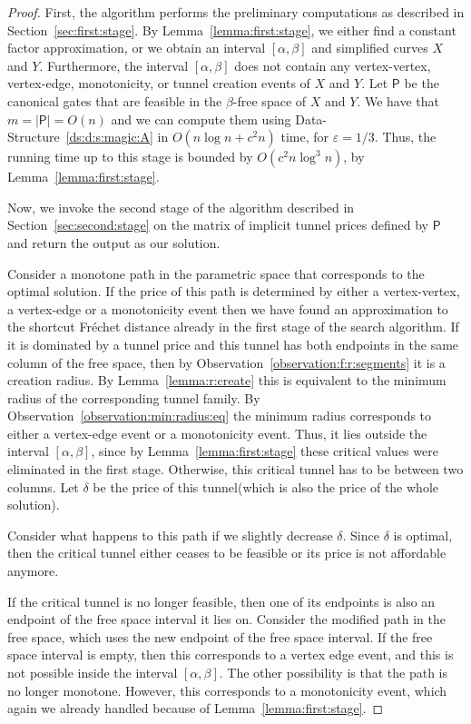 \documentclass[12pt]{article}
\newcommand{\secref}[1]{Section~\ref{sec:#1}}
\newcommand{\lemref}[1]{Lemma~\ref{lemma:#1}}
\newcommand{\dsref}[1]{Data-Structure~\ref{ds:#1}}
\newcommand{\obsref}[1]{Observation~\ref{observation:#1}}
\newcommand{\cardin}[1]{\left| {#1} \right|}
\newcommand{\Frechet}{Fr\'{e}c{h}e{}t\xspace}\providecommand{\Arr}{\mathop{\mathrm{\EuScript{A}}}}
\newcommand{\SimplifyX}[1]{#1}
\newcommand{\cXBase}{X} \newcommand{\cYBase}{Y} \newcommand{\crvCBase}{{\pi}}
\newcommand{\cX}{\SimplifyX{\cXBase}}
\newcommand{\cY}{\SimplifyX{\cYBase}}
\providecommand{\pth}[2][\!]{#1\left({#2}\right)}
\newcommand{\PntSet}{{\mathsf{P}}}
\providecommand{\eps}{{\varepsilon}}\renewcommand{\Re}{{\rm I\!\hspace{-0.025em} R}}
\newcommand{\tunnel}{tunnel\xspace}
\numberwithin{figure}{section}
\numberwithin{equation}{section}
\begin{document}
\begin{proof}
    First, the algorithm performs the preliminary computations as
    described in \secref{first:stage}. By \lemref{first:stage}, we
    either find a constant factor approximation, or we obtain an
    interval $[\alpha,\beta]$ and simplified curves $\cX$ and
    $\cY$. Furthermore, the interval $[\alpha,\beta]$ does not contain
    any vertex-vertex, vertex-edge, monotonicity, or tunnel creation
    events of $\cX$ and $\cY$.  Let $\PntSet$ be the canonical gates
    that are feasible in the \mbox{$\beta$-free} space of $\cX$ and
    $\cY$. We have that $m = \cardin{\PntSet}=O(n)$ and we can compute
    them using \dsref{d:s:magic:A} in $O( n \log n + c^2n)$ time, for
    $\eps=1/3$.  Thus, the running time up to this stage is bounded by
    $O\pth{ c^2 n\log^3 n}$, by \lemref{first:stage}.
    
    Now, we invoke the second stage of the algorithm described in
    \secref{second:stage} on the matrix of implicit tunnel prices
    defined by $\PntSet$ and return the output as our solution.
    
    Consider a monotone path in the parametric space that corresponds
    to the optimal solution. If the price of this path is determined
    by either a vertex-vertex, a vertex-edge or a monotonicity event
    then we have found an approximation to the shortcut \Frechet
    distance already in the first stage of the search algorithm.  If
    it is dominated by a tunnel price and this tunnel has both
    endpoints in the same column of the free space, then by
    \obsref{f:r:segments} it is a creation radius. By
    \lemref{r:create} this is equivalent to the minimum radius of the
    corresponding tunnel family. By \obsref{min:radius:eq} the minimum
    radius corresponds to either a vertex-edge event or a monotonicity
    event. Thus, it lies outside the interval $[\alpha,\beta]$, since
    by \lemref{first:stage} these critical values were eliminated in
    the first stage. Otherwise, this critical tunnel has to be between
    two columns.  Let $\delta$ be the price of this \tunnel (which is
    also the price of the whole solution).
    
    Consider what happens to this path if we slightly decrease
    $\delta$. Since $\delta$ is optimal, then the critical tunnel
    either ceases to be feasible or its price is not affordable
    anymore.
    
    If the critical tunnel is no longer feasible, then one of its
    endpoints is also an endpoint of the free space interval it lies
    on. Consider the modified path in the free space, which uses the
    new endpoint of the free space interval.  If the free space
    interval is empty, then this corresponds to a vertex edge event,
    and this is not possible inside the interval $[\alpha, \beta]$.
    The other possibility is that the path is no longer
    monotone. However, this corresponds to a monotonicity event, which
    again we already handled because of \lemref{first:stage}.
    

\end{proof}
\end{document}
